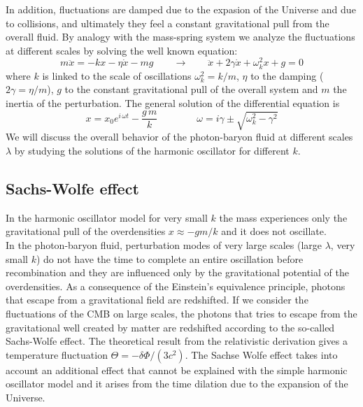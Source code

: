 \documentclass{article}
\begin{document}
In addition, fluctuations are damped due to the expasion of the Universe and due to collisions, and ultimately they feel a constant gravitational pull from the overall fluid.
By analogy with the mass-spring system we analyze the fluctuations at different scales by solving the well known equation:
\begin{equation}
m\ddot{x} = - k x - \eta \dot{x} - m g \qquad \rightarrow \qquad \ddot{x} + 2 \gamma \dot{x} + \omega_k ^2 x + g =0
\end{equation}
where $k$ is linked to the scale of oscillations $\omega_k ^2 = k/m$, $\eta$ to the damping ($2 \gamma = \eta /m$), $g$ to the constant gravitational pull of the overall system and $m$ the inertia of the perturbation.
The general solution of the differential equation is 
\begin{equation}
x = x_0 e^{i \, \omega t} - \dfrac{g \, m}{k} \qquad \qquad \omega = i \gamma \pm \sqrt{ \omega_k ^2 - \gamma^2}
\end{equation}
We will discuss the overall behavior of the photon-baryon fluid at different scales $\lambda$ by studying the solutions of the harmonic oscillator for different $k$.


\subsection{Sachs-Wolfe effect}
In the harmonic oscillator model for very small $k$ the mass experiences only the gravitational pull of the overdensities $x \approx - g m/k$ and it does not oscillate.\\
In the photon-baryon fluid, perturbation modes of very large scales (large $\lambda$, very small $k$) do not have the time to complete an entire oscillation before recombination and they are influenced only by the gravitational potential of the overdensities.
As a consequence of the Einstein's equivalence principle, photons that escape from a gravitational field are redshifted.
If we consider the fluctuations of the CMB on large scales, the photons that tries to escape from the gravitational well created by matter are redshifted according to the so-called Sachs-Wolfe effect. 
The theoretical result from the relativistic derivation gives a temperature fluctuation $\Theta = -\delta \Phi /(3c^2)$.
The Sachse Wolfe effect takes into account an additional effect that cannot be explained with the simple harmonic oscillator model and it arises from the time dilation due to the expansion of the Universe.
\end{document}

